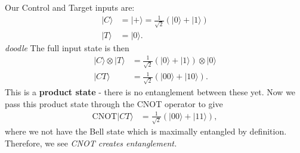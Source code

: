 \documentclass[lasers.tex]{subfiles}
\begin{document}
\begin{example}
    Our Control and Target inputs are:
    \begin{align}
        |C\rangle &= |+\rangle = \frac{1}{\sqrt{2}}\left(|0\rangle+|1\rangle\right) \\
        |T\rangle &= |0\rangle.
    \end{align}
    \textit{doodle}
    The full input state is then
    \begin{align}
        |C\rangle\otimes|T\rangle &= \frac{1}{\sqrt{2}}\left(|0\rangle+|1\rangle\right)\otimes|0\rangle \\
                       |CT\rangle &= \frac{1}{\sqrt{2}}\left(|00\rangle+|10\rangle\right).
    \end{align}
    This is a \textbf{product state} - there is no entanglement between these yet. 
    Now we pass this product state through the CNOT operator to give
    \begin{align}
        \text{CNOT}|CT\rangle &= \frac{1}{\sqrt{2}}\left(|00\rangle+|11\rangle\right),
    \end{align}
    where we not have the Bell state which is maximally entangled by definition. 
    Therefore, we see \textit{CNOT creates entanglement.}


\end{example}
\end{document}
